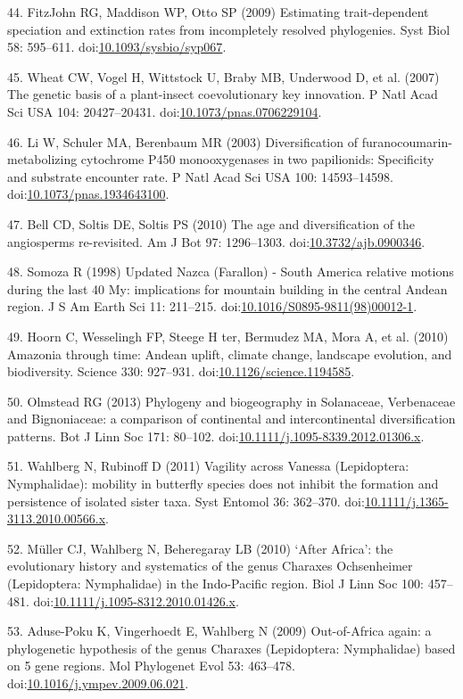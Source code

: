 \documentclass[10pt]{article}
\begin{document}
44. {FitzJohn} RG, Maddison WP, Otto SP (2009) Estimating
trait-dependent speciation and extinction rates from incompletely
resolved phylogenies. Syst Biol 58: 595--611.
doi:\href{http://dx.doi.org/10.1093/sysbio/syp067}{10.1093/sysbio/syp067}.

45. Wheat CW, Vogel H, Wittstock U, Braby MB, Underwood D, et al. (2007)
The genetic basis of a plant-insect coevolutionary key innovation. P
Natl Acad Sci USA 104: 20427--20431.
doi:\href{http://dx.doi.org/10.1073/pnas.0706229104}{10.1073/pnas.0706229104}.

46. Li W, Schuler MA, Berenbaum MR (2003) Diversification of
furanocoumarin-metabolizing cytochrome P450 monooxygenases in two
papilionids: Specificity and substrate encounter rate. P Natl Acad Sci
USA 100: 14593--14598.
doi:\href{http://dx.doi.org/10.1073/pnas.1934643100}{10.1073/pnas.1934643100}.

47. Bell CD, Soltis DE, Soltis PS (2010) The age and diversification of
the angiosperms re-revisited. Am J Bot 97: 1296--1303.
doi:\href{http://dx.doi.org/10.3732/ajb.0900346}{10.3732/ajb.0900346}.

48. Somoza R (1998) Updated Nazca (Farallon) - South America relative
motions during the last 40 My: implications for mountain building in the
central Andean region. J S Am Earth Sci 11: 211--215.
doi:\href{http://dx.doi.org/10.1016/S0895-9811(98)00012-1}{10.1016/S0895-9811(98)00012-1}.

49. Hoorn C, Wesselingh FP, Steege H ter, Bermudez MA, Mora A, et al.
(2010) Amazonia through time: Andean uplift, climate change, landscape
evolution, and biodiversity. Science 330: 927--931.
doi:\href{http://dx.doi.org/10.1126/science.1194585}{10.1126/science.1194585}.

50. Olmstead RG (2013) Phylogeny and biogeography in Solanaceae,
Verbenaceae and Bignoniaceae: a comparison of continental and
intercontinental diversification patterns. Bot J Linn Soc 171: 80--102.
doi:\href{http://dx.doi.org/10.1111/j.1095-8339.2012.01306.x}{10.1111/j.1095-8339.2012.01306.x}.

51. Wahlberg N, Rubinoff D (2011) Vagility across Vanessa (Lepidoptera:
Nymphalidae): mobility in butterfly species does not inhibit the
formation and persistence of isolated sister taxa. Syst Entomol 36:
362--370.
doi:\href{http://dx.doi.org/10.1111/j.1365-3113.2010.00566.x}{10.1111/j.1365-3113.2010.00566.x}.

52. Müller CJ, Wahlberg N, Beheregaray LB (2010) `After Africa': the
evolutionary history and systematics of the genus Charaxes Ochsenheimer
(Lepidoptera: Nymphalidae) in the Indo-Pacific region. Biol J Linn Soc
100: 457--481.
doi:\href{http://dx.doi.org/10.1111/j.1095-8312.2010.01426.x}{10.1111/j.1095-8312.2010.01426.x}.

53. Aduse-Poku K, Vingerhoedt E, Wahlberg N (2009) Out-of-Africa again:
a phylogenetic hypothesis of the genus Charaxes (Lepidoptera:
Nymphalidae) based on 5 gene regions. Mol Phylogenet Evol 53: 463--478.
doi:\href{http://dx.doi.org/10.1016/j.ympev.2009.06.021}{10.1016/j.ympev.2009.06.021}.
\end{document}
